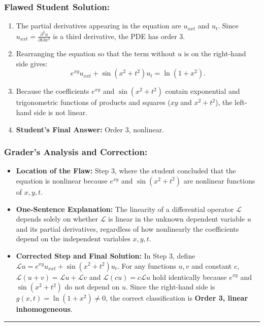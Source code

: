 \documentclass[11pt,a4paper]{article}
\begin{document}
\subsubsection*{Flawed Student Solution:}
\begin{enumerate}
    \item The partial derivatives appearing in the equation are $u_{xxt}$ and $u_t$. Since $u_{xxt} = \frac{\partial^3 u}{\partial t \partial x^2}$ is a third derivative, the PDE has order $3$.
    \item Rearranging the equation so that the term without $u$ is on the right-hand side gives:
    \[
        e^{xy} u_{xxt} + \sin(x^2 + t^2)u_t = \ln(1 + x^2).
    \]
    \item Because the coefficients $e^{xy}$ and $\sin(x^2 + t^2)$ contain exponential and trigonometric functions of products and squares ($xy$ and $x^2 + t^2$), the left-hand side is not linear.
    \item \textbf{Student's Final Answer:} Order 3, nonlinear.
\end{enumerate}

\subsubsection*{Grader's Analysis and Correction:}
\begin{itemize}
    \item \textbf{Location of the Flaw:} Step 3, where the student concluded that the equation is nonlinear because $e^{xy}$ and $\sin(x^2 + t^2)$ are nonlinear functions of $x, y, t$.
    \item \textbf{One-Sentence Explanation:} The linearity of a differential operator $\mathcal{L}$ depends solely on whether $\mathcal{L}$ is linear in the unknown dependent variable $u$ and its partial derivatives, regardless of how nonlinearly the coefficients depend on the independent variables $x, y, t$.
    \item \textbf{Corrected Step and Final Solution:}
    In Step 3, define $\mathcal{L}u = e^{xy}u_{xxt} + \sin(x^2 + t^2)u_t$. For any functions $u, v$ and constant $c$, $\mathcal{L}(u + v) = \mathcal{L}u + \mathcal{L}v$ and $\mathcal{L}(cu) = c\mathcal{L}u$ hold identically because $e^{xy}$ and $\sin(x^2 + t^2)$ do not depend on $u$. Since the right-hand side is $g(x, t) = \ln(1 + x^2) \neq 0$, the correct classification is \textbf{Order 3, linear inhomogeneous}.
\end{itemize}

\bigskip
\hrule
\bigskip
\end{document}
